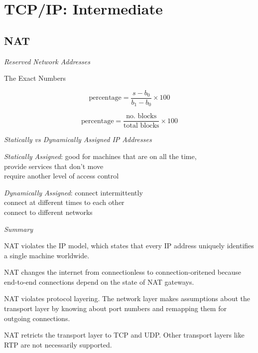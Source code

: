 \chapter{TCP/IP: Intermediate}



\section{NAT}

\frmrule 

\textit{Reserved Network Addresses}



\begin{sidenote}{The Exact Numbers}

$$\text{percentage} = \frac{s - b_0}{b_1-b_0} \times 100$$

$$\text{percentage} = \frac{\text{no. blocks}}{\text{total blocks}} \times 100$$

\end{sidenote}



\frmrule 

\textit{Statically vs Dynamically Assigned IP Addresses}


\textit{Statically Assigned}:
good for machines that are on all the time, \\
provide services that don't move \\
require another level of access control 

\textit{Dynamically Assigned}:
connect intermittently\\
connect at different times to each other \\
connect to different networks



\frmrule 

\textit{Summary}

NAT violates the IP model, which states that every IP address uniquely 
identifies a single machine worldwide. 

NAT changes the internet from connectionless to connection-oritened 
because end-to-end connections depend on the state of NAT gateways. 

NAT violates protocol layering. The network layer makes 
assumptions about the transport layer by knowing about port 
numbers and remapping them for outgoing connections. 

NAT retricts the transport layer to TCP and UDP. 
Other transport layers like RTP are not necessarily supported. 

